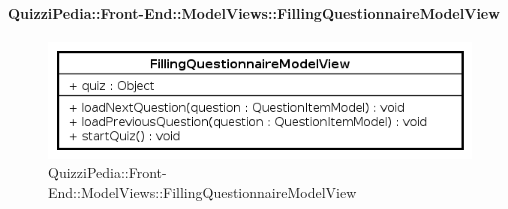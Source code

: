 	\paragraph{QuizziPedia::Front-End::ModelViews::FillingQuestionnaireModelView}
	
	\label{QuizziPedia::Front-End::ModelViews::FillingQuestionnaireModelView}
	
	\begin{figure}[ht]
		\centering
		\includegraphics[scale=0.8,keepaspectratio]{UML/Classi/Front-End/QuizziPedia_Front-end_ModelView_FillingQuestionnaireModelView.png}
		\caption{QuizziPedia::Front-End::ModelViews::FillingQuestionnaireModelView}
	\end{figure} \FloatBarrier
	
